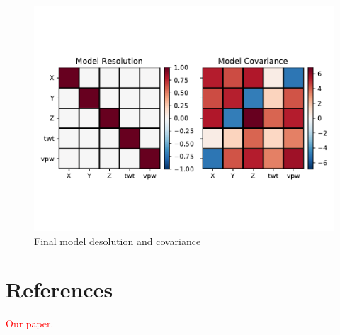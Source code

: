 \documentclass[titlepage, 12pt]{article}
\begin{document}
  \begin{figure}[!htb]
   \centering
   \includegraphics[width=0.9\linewidth]{resolution_matrices.pdf}
   \caption{Final model desolution and covariance}
  \end{figure}

 \section*{References}
 \textcolor{red}{Our paper.}
\end{document}
